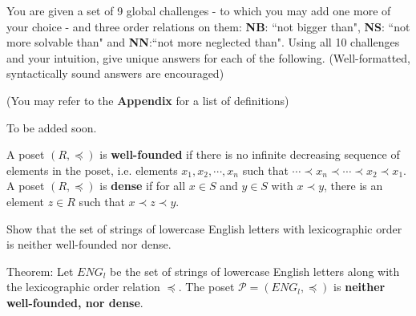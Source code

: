 \documentclass[addpoints]{exam}
\begin{document}
\begin{questions}
You are given a set of 9 global challenges - to which you may add one more of your choice - and three order relations on them: \textbf{NB}: ``not bigger than", \textbf{NS}: ``not more solvable than" and \textbf{NN}:``not more neglected than". Using all 10 challenges and your intuition, give unique answers for each of the following. (Well-formatted, syntactically sound answers are encouraged) 


(You may refer to the \textbf{Appendix} for a list of definitions)


  \begin{solution}
    To be added soon.
  \end{solution}
  
\question 
A poset $(R, \preccurlyeq)$ is \textbf{well-founded} if there is no infinite decreasing sequence of elements in the poset, i.e. elements $x_1, x_2, \cdots, x_n$ such that $\cdots \prec x_n \prec \cdots  \prec x_2 \prec x_1$. A poset $(R, \preccurlyeq)$ is \textbf{dense} if for all $x \in S$ and $y \in S$ with $x \prec y$, there is an element $z \in R$ such that $x \prec z \prec y$.

Show that the set of strings of lowercase English letters with lexicographic order is neither well-founded nor dense.


  \begin{solution}
    
    Theorem: Let $ENG_l$ be the set of strings of lowercase English letters along with the lexicographic order relation $\preccurlyeq$. The poset $\mathcal{P} = (ENG_l,\preccurlyeq)$ is \textbf{neither well-founded, nor dense}.
    

\end{solution}
\end{questions}
\end{document}
